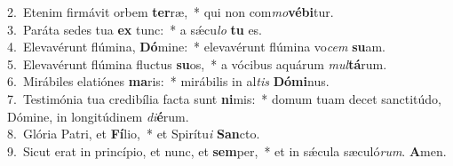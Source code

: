 {2.~}Etenim firmávit orbem \textbf{ter}ræ,~* qui non com\textit{mo}\textbf{vé}\textbf{bi}tur.\\
{3.~}Paráta sedes tua \textbf{ex} tunc:~* a sǽcu\textit{lo} \textbf{tu} es.\\
{4.~}Elevavérunt flúmina, \textbf{Dó}mine:~* elevavérunt flúmina vo\textit{cem} \textbf{su}am.\\
{5.~}Elevavérunt flúmina fluctus \textbf{su}os,~* a vócibus aquárum \textit{mul}\textbf{tá}rum.\\
{6.~}Mirábiles elatiónes \textbf{ma}ris:~* mirábilis in al\textit{tis} \textbf{Dó}\textbf{mi}nus.\\
{7.~}Testimónia tua credibília facta sunt \textbf{ni}mis:~* domum tuam decet sanctitúdo, Dómine, in longitúdinem \textit{di}\textbf{é}rum.\\
{8.~}Glória Patri, et \textbf{Fí}lio,~* et Spirítu\textit{i} \textbf{San}cto.\\
{9.~}Sicut erat in princípio, et nunc, et \textbf{sem}per,~* et in sǽcula sæculó\textit{rum}. \textbf{A}men.\\
